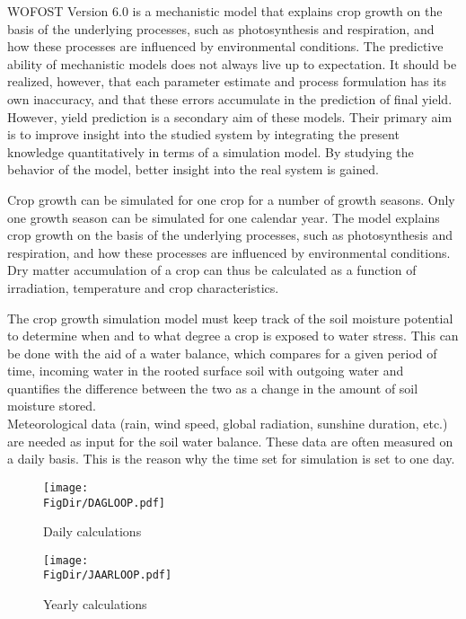 WOFOST Version 6.0 is a mechanistic model that explains crop growth on the basis
of the underlying processes, such as photosynthesis and respiration, and how these
processes are influenced by environmental conditions. The predictive ability of
mechanistic models does not always live up to expectation. It should be realized,
however, that each parameter estimate and process formulation has its own inaccura\-cy, 
and that these errors accumulate in the prediction of final yield. However, yield
prediction is a secondary aim of these models. Their primary aim is to improve
insight into the studied system by integrating the present knowl\-edge quantitatively in
terms of a simulation model. By studying the behavior of the model, better insight
into the real system is gained.

Crop growth can be simulated for one crop for a number of growth seasons. Only
one growth season can be simulated for one calendar year.  The model explains crop
growth on the basis of the underly\-ing processes, such as photosynthesis and respira\-tion, 
and how these processes are influenced by environmental conditions. \\
Dry matter accumulation of a crop can thus be calculated as a function of irradiation,
temperature and crop characteristics.

The crop growth simulation model must keep track of the soil moisture potential to
deter\-mine when and to what degree a crop is exposed to water stress. This can be
done with the aid of a water balance, which compares for a given period of time,
incoming water in the rooted surface soil with outgoing water and quantifies the
difference between the two as a change in the amount of soil moisture stored.\\
Meteorological data (rain, wind speed, global radiation, sunshine duration, etc.) are
needed as input for the soil water balance. These data are often measured on a daily
basis. This is the reason why the time set for simulation is set to one day. \\

\begin{figure}[htbp]
\centering
\texttt{[image: \\FigDir/DAGLOOP.pdf]}
\caption{Daily calculations}
\label{fig:dayloop}
\end{figure}

\begin{figure}[htbp]
\centering
\texttt{[image: \\FigDir/JAARLOOP.pdf]}
\caption{Yearly calculations}
\label{fig:yearloop}
\end{figure}


